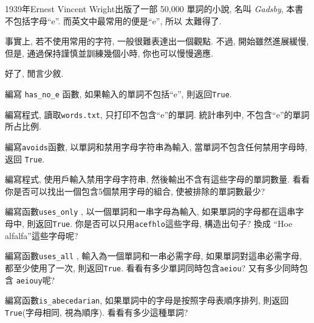 \documentclass[10pt]{book}
\begin{document}
\begin{exercise}

1939年Ernest Vincent Wright出版了一部 50,000 單詞的小說, 名叫
{\em Gadsby}, 本書不包括字母``e''. 而英文中最常用的便是``e'', 所以
太難得了. 

事實上, 若不使用常用的字符, 一般很難表達出一個觀點. 
不過, 開始雖然進展緩慢, 但是, 通過保持謹慎並訓練幾個小時, 
你也可以慢慢適應. 

好了, 閒言少敘. 

編寫 \verb"has_no_e" 函數, 如果輸入的單詞不包括``e'',  則返回{\tt True}. 

編寫程式, 讀取{\tt words.txt}, 只打印不包含``e''的單詞. 
統計串列中, 不包含``e''的單詞所占比例. 

\end{exercise}


\begin{exercise} 

編寫{\tt avoids}函數, 以單詞和禁用字母字符串為輸入, 當單詞不包含任何禁用字母時, 
返回 {\tt True}. 

編寫程式, 使用戶輸入禁用字母字符串, 
然後輸出不含有這些字母的單詞數量. 
看看你是否可以找出一個包含5個禁用字母的組合, 
使被排除的單詞數最少?

\end{exercise}


\begin{exercise}

編寫函數\verb"uses_only" , 以一個單詞和一串字母為輸入, 
如果單詞的字母都在這串字母中, 則返回{\tt True}.
你是否可以只用{\tt acefhlo}這些字母, 構造出句子?
換成 ``Hoe alfalfa''這些字母呢?

\end{exercise}


\begin{exercise} 

編寫函數\verb"uses_all" , 輸入為一個單詞和一串必需字母, 
如果單詞對這串必需字母, 都至少使用了一次, 則返回{\tt True}. 
看看有多少單詞同時包含{\tt aeiou}? 又有多少同時包含 {\tt aeiouy}呢?

\end{exercise}


\begin{exercise}
編寫函數\verb"is_abecedarian", 如果單詞中的字母是按照字母表順序排列, 
則返回 {\tt True}(字母相同, 視為順序). 看看有多少這種單詞?


\end{exercise}
\end{document}

